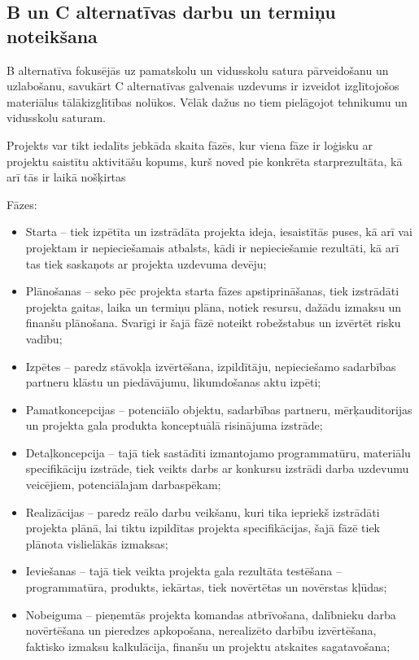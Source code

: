 \subsection{B un C alternatīvas darbu un termiņu noteikšana}
B alternatīva fokusējās uz pamatskolu un vidusskolu satura pārveidošanu un uzlabošanu, savukārt C alternatīvas
galvenais uzdevums ir izveidot izglītojošos materiālus tālākizglītības nolūkos. Vēlāk dažus no tiem pielāgojot
tehnikumu un vidusskolu saturam.
\par
Projekts var tikt iedalīts jebkāda skaita fāzēs, kur viena fāze ir
loģisku ar projektu saistītu aktivitāšu kopums, kurš noved pie konkrēta starprezultāta, kā arī tās ir
laikā nošķirtas %
\par
Fāzes:
\begin{itemize}
    \item Starta – tiek izpētīta un izstrādāta projekta ideja, iesaistītās puses, kā arī vai projektam ir
    nepieciešamais atbalsts, kādi ir nepieciešamie rezultāti, kā arī tas tiek saskaņots ar projekta
    uzdevuma devēju;
    \item Plānošanas – seko pēc projekta starta fāzes apstiprināšanas, tiek izstrādāti projekta
    gaitas, laika un termiņu plāna, notiek resursu, dažādu izmaksu un finanšu plānošana. Svarīgi
    ir šajā fāzē noteikt robežstabus un izvērtēt risku vadību;
    \item Izpētes – paredz stāvokļa izvērtēšana, izpildītāju, nepieciešamo sadarbības partneru
    klāstu un piedāvājumu, likumdošanas aktu izpēti;
    \item Pamatkoncepcijas – potenciālo objektu, sadarbības partneru, mērķauditorijas un
    projekta gala produkta konceptuālā risinājuma izstrāde;
    \item Detaļkoncepcija – tajā tiek sastādīti izmantojamo programmatūru, materiālu specifikāciju
    izstrāde, tiek veikts darbs ar konkursu izstrādi darba uzdevumu veicējiem, potenciālajam
    darbaspēkam;
    \item Realizācijas – paredz reālo darbu veikšanu, kuri tika iepriekš izstrādāti projekta
    plānā, lai tiktu izpildītas projekta specifikācijas, šajā fāzē tiek plānota vislielākās izmaksas;
    \item Ieviešanas – tajā tiek veikta projekta gala rezultāta testēšana – programmatūra,
    produkts, iekārtas, tiek novērtētas un novērstas kļūdas;
    \item Nobeiguma – pieņemtās projekta komandas atbrīvošana, dalībnieku darba novērtēšana
    un pieredzes apkopošana, nerealizēto darbību izvērtēšana, faktisko izmaksu kalkulācija,
    finanšu un projektu atskaites sagatavošana;
\end{itemize}
